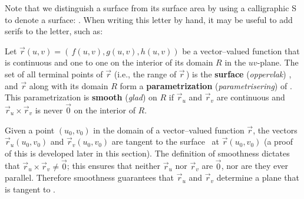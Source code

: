 Note that we distinguish a surface from its surface area by using a calligraphic S to denote a surface: \surfaceS. When writing this letter by hand, it may be useful to add serifs to the letter, such as: %


\begin{definition}
\label{def:parametrized_surface}
Let $\vec r(u,v) = \left(\, f(u,v),g(u,v),h(u,v)\right)$ be a vector--valued function that is continuous and one to one on the interior of its domain $R$ in the $uv$-plane. The set of all terminal points of $\vec r$ (i.e., the range of $\vec r$\,) is the \textbf{surface} (\textit{oppervlak}) \surfaceS, and $\vec r$ along with its domain $R$ form a \textbf{parametrization} (\textit{parametrisering}) of \surfaceS.\\
This parametrization is \textbf{smooth} (\textit{glad}) on $R$ if $\vec r_u$ and $\vec r_v$ are continuous and $\vec r_u\times \vec r_v$ is never $\vec 0$ on the interior of $R$.
\end{definition}


Given a point $(u_0,v_0)$ in the domain of a vector--valued function $\vec r$, the vectors $\vec r_u(u_0,v_0)$ and $\vec r_v(u_0,v_0)$ are tangent to the surface \surfaceS\ at $\vec r(u_0,v_0)$ (a proof of this is developed later in this section). The definition of smoothness dictates that $\vec r_u\times \vec r_v \neq \vec 0$; this ensures that neither $\vec r_u$ nor $\vec r_v$ are $\vec 0$, nor are they ever parallel. Therefore smoothness guarantees that $\vec r_u$ and $\vec r_v$ determine a plane that is tangent to \surfaceS.

